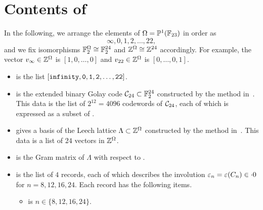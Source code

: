 \documentclass{amsart} %
\begin{document}
\section{Contents of }
%
In the following, we arrange the elements of $\Omega=\mathord{\mathbb{P}}^1(\mathord{\mathbb{F}}_{23})$ in order as 
\[
\infty, 0, 1,2 , \dots, 22, 
\]
and we  fix isomorphisms  
$\mathord{\mathbb{F}}_2^{\Omega}\cong \mathord{\mathbb{F}}_2^{24}$ and  $\mathord{\mathbb{Z}}^{\Omega}\cong \mathord{\mathbb{Z}}^{24}$
accordingly.
For example, the vector $v_{\infty}\in \mathord{\mathbb{Z}}^{\Omega}$ is $[1, 0, \dots, 0]$
and $v_{22}\in \mathord{\mathbb{Z}}^{\Omega}$ is $[0, \dots, 0, 1]$.
%
\begin{itemize}
%
\item {} is the list
$\tt{[infinity, 0,1,2,\dots, 22]}$.
%
 \item {} is the extended binary Golay code $\mathord{\mathcal{C}}_{24}\subset \mathord{\mathbb{F}}_2^{24}$
constructed by the method in~\cite[Chapter~10.2]{TheCSbook}.
This data is the list of $2^{12}=4096$ codewords of $\mathord{\mathcal{C}}_{24}$,
each of which 
is expressed as a subset of .
%
%
\item {} gives a basis of the Leech lattice $\Lambda\subset \mathord{\mathbb{Z}}^{\Omega}$
constructed by the method in~\cite[Chapter~10.3]{TheCSbook}.
This data  %
is a list of $24$ vectors in $\mathord{\mathbb{Z}}^{\Omega}$.
%
\item {} is the Gram matrix of  $\Lambda$
with respect to .
%
\item {} is the list of $4$ records,
each of which describes the involution $\varepsilon_n=\varepsilon(C_n)\in \cdot 0$
for $n=8, 12, 16, 24$.
Each record has the following items.
%
%
\begin{itemize}
%
\item {} is $n\in \{8, 12, 16, 24\}$.
%
%

\end{itemize}
\end{itemize}
\end{document}
